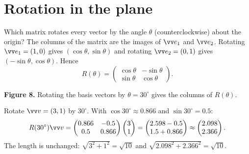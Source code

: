 \label{ch:rotation}

\section*{Rotation in the plane}
Which matrix rotates every vector by the angle $\theta$ (counterclockwise) about the origin? The columns of the matrix are the images of $\vv e_1$ and $\vv e_2$. Rotating $\vv e_1=(1,0)$ gives $(\cos\theta,\sin\theta)$ and rotating $\vv e_2=(0,1)$ gives $(-\sin\theta,\cos\theta)$. Hence
\[
\boxed{R(\theta)=\begin{pmatrix}\cos\theta&-\sin\theta\\\sin\theta&\cos\theta\end{pmatrix}.}
\]

\begin{center}

\small\textbf{Figure 8.} Rotating the basis vectors by $\theta=30^\circ$ gives the columns of $R(\theta)$.
\end{center}

\begin{example}
Rotate $\vv v=(3,1)$ by $30^\circ$. With $\cos30^\circ\approx0.866$ and $\sin30^\circ=0.5$:
\[
R(30^\circ)\vv v=\begin{pmatrix}0.866&-0.5\\0.5&0.866\end{pmatrix}\begin{pmatrix}3\\1\end{pmatrix}
=\begin{pmatrix}2.598-0.5\\1.5+0.866\end{pmatrix}\approx\begin{pmatrix}2.098\\2.366\end{pmatrix}.
\]
The length is unchanged: $\sqrt{3^2+1^2}=\sqrt{10}$ and $\sqrt{2.098^2+2.366^2}=\sqrt{10}$.
\end{example}

